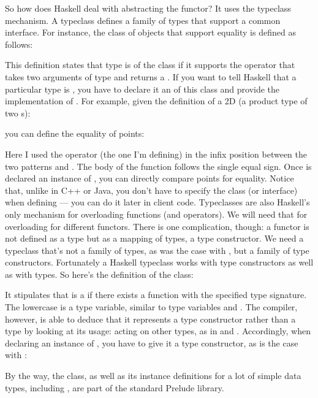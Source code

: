 So how does Haskell deal with abstracting the functor? It uses the
typeclass mechanism. A typeclass defines a family of types that support
a common interface. For instance, the class of objects that support
equality is defined as follows:

This definition states that type  is of the class 
if it supports the operator \code{(==)} that takes two arguments of
type  and returns a . If you want to tell Haskell
that a particular type is , you have to declare it an
 of this class and provide the implementation of
\code{(==)}. For example, given the definition of a 2D 
(a product type of two s):

you can define the equality of points:

Here I used the operator \code{(==)} (the one I'm defining) in the
infix position between the two patterns  and
. The body of the function follows the
single equal sign. Once  is declared an instance of
, you can directly compare points for equality. Notice that,
unlike in C++ or Java, you don't have to specify the  class
(or interface) when defining  --- you can do it later in
client code. Typeclasses are also Haskell's only mechanism for
overloading functions (and operators). We will need that for overloading
 for different functors. There is one complication, though:
a functor is not defined as a type but as a mapping of types, a type
constructor. We need a typeclass that's not a family of types, as was
the case with , but a family of type constructors.
Fortunately a Haskell typeclass works with type constructors as well as
with types. So here's the definition of the  class:

It stipulates that  is a  if there exists a
function  with the specified type signature. The lowercase
 is a type variable, similar to type variables  and
. The compiler, however, is able to deduce that it represents
a type constructor rather than a type by looking at its usage: acting on
other types, as in  and . Accordingly, when
declaring an instance of , you have to give it a type
constructor, as is the case with :

By the way, the  class, as well as its instance
definitions for a lot of simple data types, including ,
are part of the standard Prelude library.

